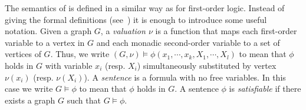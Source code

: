 The semantics of \msol is defined in a similar way as for first-order logic. Instead of giving the formal definitions (see~\cite{EbFl95}) it is enough to introduce some useful notation. Given a graph $G$, a \emph{valuation $\nu$} is a function that maps each first-order variable to a vertex in $G$ and each monadic second-order variable to a set of vertices of $G$. Thus, we write $(G,\nu) \models \phi(x_1,\cdots,x_k,X_1, \cdots, X_l)$ to mean that $\phi$ holds in $G$ with variable $x_i$ (resp. $X_i$) simultaneously substituted by vertex $\nu(x_i)$ (resp. $\nu(X_i)$).
A {\em sentence} is a formula with no free variables. In this case we write $G \models \phi$ to mean that $\phi$ holds in $G$. A sentence $\phi$ is \emph{satisfiable} if there exists a graph $G$ such that $G \models \phi$.






